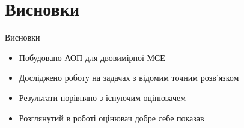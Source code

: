 
\section{Висновки}

\begin{frame}{Висновки}
	\begin{itemize}
		\item Побудовано АОП для двовимірної МСЕ
		\item Досліджено роботу на задачах з відомим точним розв'язком
		\item Результати порівняно з існуючим оцінювачем
		\item Розглянутий в роботі оцінювач добре себе показав
	\end{itemize}
\end{frame}
